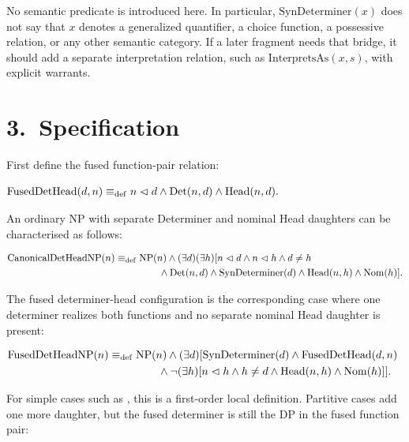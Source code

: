 \documentclass[11pt]{article}
\newcommand{\SynDmr}{\mathrm{SynDeterminer}}
\newcommand{\InterpAs}{\mathrm{InterpretsAs}}
\newcommand{\FusedDetHead}{\mathrm{FusedDetHead}}
\newcommand{\FusedDetHeadNP}{\mathrm{FusedDetHeadNP}}
\newcommand{\CanonicalDetHeadNP}{\mathrm{CanonicalDetHeadNP}}
\begin{document}
No semantic predicate is introduced here. In particular, $\SynDmr(x)$ does not
say that $x$ denotes a generalized quantifier, a choice function, a possessive
relation, or any other semantic category. If a later fragment needs that
bridge, it should add a separate interpretation relation, such as
$\InterpAs(x,s)$, with explicit warrants.

\section*{3.~Specification}

First define the fused function-pair relation:

\ea\label{ex:fused-det-head}
$\begin{aligned}
\FusedDetHead(d,n) \defas {} & n \imdom d \wedge \Det(n,d) \wedge \Hd(n,d).
\end{aligned}$\\
\z

An ordinary NP with separate Determiner and nominal Head daughters can be
characterised as follows:

\ea\label{ex:canonical-det-head}
$\begin{aligned}
\CanonicalDetHeadNP(n) \defas {} & \NP(n) \wedge
  (\exists d)(\exists h)[n \imdom d \wedge n \imdom h \wedge d \neq h \\
& \qquad {} \wedge \Det(n,d) \wedge \SynDmr(d)
  \wedge \Hd(n,h) \wedge \Nom(h)].
\end{aligned}$\\
\z

The fused determiner-head configuration is the corresponding case where one
determiner realizes both functions and no separate nominal Head daughter is
present:

\ea\label{ex:fused-det-head-np}
$\begin{aligned}
\FusedDetHeadNP(n) \defas {} & \NP(n) \wedge
  (\exists d)[\SynDmr(d) \wedge \FusedDetHead(d,n) \\
& \qquad {} \wedge
  \neg(\exists h)[n \imdom h \wedge h \neq d \wedge \Hd(n,h) \wedge \Nom(h)]].
\end{aligned}$\\
\z

For simple cases such as , this is a first-order local
definition. Partitive cases add one more daughter, but the fused determiner is
still the DP in the fused function pair:
\end{document}
